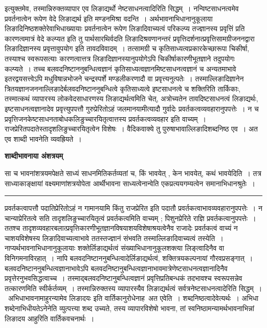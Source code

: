 \documentclass[11pt, openany]{book}
\begin{document}
इत्युक्तमेव, तस्मान्निरुक्तव्यापार एव लिङाद्यर्थो नेष्टसाधनत्वादिरिति सिद्धम्~। {\br नन्वि}ष्टसाधनत्वमेव प्रवर्तनात्वेन रूपेण वेदे लिङाद्यर्थ इति मण्डनमिश्रा वदन्ति~। अर्थभावनाभिधानानुकूलाया लिङादिनिष्ठशक्तेरेवाभिधाख्यायाः प्रवर्तनात्वेन रूपेण लिङादिवाच्यत्वं परिकल्प्य तज्ज्ञानस्य प्रवृत्तिं प्रति कारणत्वमात्रं वेदे कल्प्यत इति तु
पार्थसारथिर्वदति लिङादिश्रवणानन्तरं प्रवृत्तिदर्शनात्प्रवृत्तिसामग्रीजननद्वारा लिङादिज्ञानस्य प्रवृत्तावुपयोग इति तावदविवादम्~। तत्सामग्री च कृतिसाध्यत्वप्रकारकेच्छारूपा चिकीर्षा, तस्याश्च स्वरूपसत्याः कारणत्वात्तत्र लिङादिज्ञानस्यानुपयोगेऽपि चिकीर्षाकारणीभूतज्ञाने तदुपयोगः कल्प्यते~। तच्च बलवदनिष्टाननुबन्धित्वज्ञानं कृतिसाध्यत्वज्ञानमिष्टसाधनत्वज्ञानं च अन्यतमाभावे इतरद्वयसत्त्वेऽपि मधुविषान्नभोजने चन्द्रस्पर्शे मण्डलीकरणादौ वा प्रवृत्त्यनुत्पतेः~। तस्माल्लिङादिज्ञानेन त्रितयज्ञानजननाल्लिङादेर्बलवदनिष्टाननुबन्धित्वे कृतिसाध्यत्वे इष्टसाधनत्वे च शक्तिरिति तार्किकाः, तस्मात्कथं व्यापारस्य लोकवेदसाधारणस्य लिङाद्यर्थत्वमिति चेत्, अत्रोच्यते\textendash न तावदिष्टसाधनत्वं लिङाद्यर्थः, इष्टसाधनत्वज्ञानादेव प्रवृत्त्युपपत्तौ गुरुप्रेरितोऽहं जलमानयामीत्यादौ गुर्वादेः प्रवर्तकत्वव्यवहारानुपपत्तेः~। न च
प्रवृत्तिजनकेष्टसाधनताबोधकलिङुच्चारयितृत्वात्तस्य प्रवर्तकत्वव्यवहार इति वाच्यम्~। राजप्रेरितपदातेस्तादृशलिङुच्चारयितृत्वेन 
\newpage
\fancyhead[LO]{वैदिकभेदौ ]}
{\bl\noindent
विशेषः~। वैदिकवाक्ये तु पुरुषाभावाल्लिङादिशब्दनिष्ठ एव~। अत एव शाब्दी भावनेति व्यवह्रियते~।~}
\begin{center}
 \textbf{शाब्दीभावनाया अंशत्रयम्    }
\end{center}
 
{\bl सा च भावनांशत्रयमपेक्षते साध्यं साधनमितिकर्तव्यतां  च, {\qtl किं भावयेत् , केन भावयेत्, कथं भावयेदिति}~। तत्र साध्याकाङ्क्षायां वक्ष्यमाणांशत्रयोपेता आर्थीभावना साध्यत्वेनान्वेति एकप्रत्ययगम्यत्वेन समानाभिधानश्रुतेः~।}\\
\hrule
\vspace{3mm}
\noindent
प्रवर्तकत्वापत्तौ पदातिप्रेरितोऽहं न गामानयामि किंतु राजप्रेरित इति पदातौ प्रवर्तकत्वाभावव्यवहारानुपपत्तेः~। न चान्याप्रेरितत्वे सति तादृशलिङुच्चारयितृत्वं प्रवर्तकत्वमिति वाच्यम् ; पिशुनप्रेरिते राज्ञि प्रवर्तकत्वानुपपत्तेः~। ततश्च तादृशव्यवहारबलात्प्रवृत्तिकारणीभूतज्ञानविषयाशयविशेषाश्रयत्वेनैव राजादेः प्रवर्तकत्वं वाच्यं न चाशयविशेषस्य लिङादिवाच्यत्वाभावे ततस्तज्ज्ञानं संभवति तस्माल्लिङादिवाच्यत्वं तस्येति~।नाप्यर्थभावनाभिधानानुकूलायाः शक्तेर्लिङाद्यर्थत्वं संख्याभिधानानुकूलशक्त्या लिङ्त्वादिनैव वा
विनिगमनाविरहात्~। नापि बलवदनिष्टाननुबन्धित्वादेर्लिङाद्यर्थत्वं, शक्तित्रयकल्पनायां गौरवप्रसङ्गात्~। बलवदनिष्टाननुबन्धित्वज्ञानाभावेऽपि बलवदनिष्टानुबन्धित्वज्ञानाभावमात्रेणेष्टसाधनत्वज्ञानादिनैव प्रवृत्तेरनुभवसिद्धत्वाच्च~। तस्माद्बलवदनिष्टानुबन्धित्वज्ञानं प्रवृत्तिप्रतिबन्धकं तदभावश्च स्वरूपसन्नेव तत्कारणमिति स्वीर्कर्तव्यम्~। तस्मान्निरुक्तस्य व्यापारस्यैव लिङाद्यर्थत्वं सर्वत्रनेष्टसाधनत्वादेरिति सिद्धम्~।~{\qt अभिधाभावनामाहुरन्यामेव लिङादयः} इति वार्तिकानुरोधेनाह\textendash\ {\br अत एवेति~।} शब्दनिष्ठत्वादेवेत्यर्थः~। {\qt अभिधा} शब्देनाभिधीयतेऽनेनेति व्युत्पत्त्या शब्द उच्यते, तस्य व्यापारविशेषो भावना, तां स्वनिष्ठामन्यामर्थभावनाभिन्नां लिङादय आहुरिति वार्तिकवचनार्थः~।~\\
\end{document}
